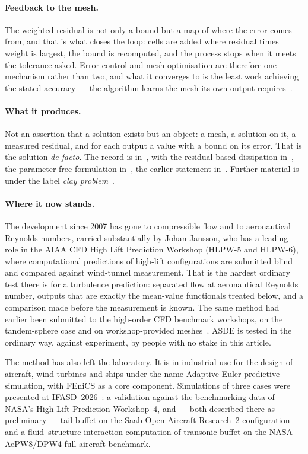\documentclass[11pt]{article}
\begin{document}
\paragraph{Feedback to the mesh.} The weighted residual is not only a bound but a map of where the
error comes from, and that is what closes the loop: cells are added where residual times weight is
largest, the bound is recomputed, and the process stops when it meets the tolerance asked. Error
control and mesh optimisation are therefore one mechanism rather than two, and what it converges to
is the least work achieving the stated accuracy --- the algorithm learns the mesh its own output
requires~\cite{cedya01,eriksson17}.

\paragraph{What it produces.} Not an assertion that a solution exists but an object: a mesh, a
solution on it, a measured residual, and for each output a value with a bound on its error. That is
the solution \emph{de facto}. The record is in~\cite{cfd}, with the residual-based dissipation
in~\cite{hjv}, the parameter-free formulation in~\cite{hjja}, the earlier statement
in~\cite{newapproach}. Further material is under the label \emph{clay problem}~\cite{blog}.

\paragraph{Where it now stands.} The development since 2007 has gone to compressible flow and to
aeronautical Reynolds numbers, carried substantially by Johan Jansson, who has a leading role in
the AIAA CFD High Lift Prediction Workshop (HLPW-5 and HLPW-6), where computational predictions of
high-lift configurations are submitted blind and compared against wind-tunnel measurement. That is
the hardest ordinary test there is for a turbulence prediction: separated flow at aeronautical
Reynolds number, outputs that are exactly the mean-value functionals treated below, and a
comparison made before the measurement is known. The same method had earlier been submitted to the
high-order CFD benchmark workshops, on the tandem-sphere case and on workshop-provided
meshes~\cite{cs1}. ASDE is tested in the ordinary way, against experiment, by people with no stake in
this article.

The method has also left the laboratory. It is in industrial use for the design of aircraft, wind
turbines and ships under the name Adaptive Euler predictive simulation, with FEniCS as
a core component. Simulations of three cases were presented at IFASD~2026~\cite{ifasd}: a validation
against the benchmarking data of NASA's High Lift Prediction Workshop~4, and --- both described there
as preliminary --- tail buffet on the Saab Open Aircraft Research~2 configuration and a
fluid--structure interaction computation of transonic buffet on the NASA AePW8/DPW4 full-aircraft
benchmark.
\end{document}
